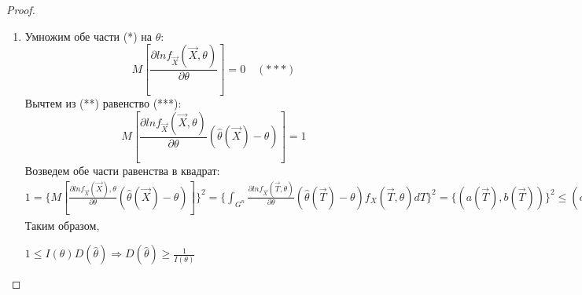 \documentclass[a4paper, 12pt]{article}
\theoremstyle{definition}
\theoremstyle{leads}
\theoremstyle{example}
\begin{document}
\begin{proof}
\begin{enumerate}
\begin{displaymath}
	\end{displaymath}
	\item Умножим обе части (*) на $\theta$:
	\begin{displaymath}
		M [\frac{\partial ln f_{\vec{X}}(\vec{X}, \theta)}{\partial \theta}] = 0 \quad (***)
	\end{displaymath}
	Вычтем из (**) равенство (***):
	\begin{displaymath}
		M [\frac{\partial ln f_{\vec{X}}(\vec{X}, \theta)}{\partial \theta}(\hat{\theta}(\vec{X}) - \theta)] = 1
	\end{displaymath}
	Возведем обе части равенства в квадрат: \\
	$
		1 = \{M [\frac{\partial ln f_{\vec{X}}(\vec{X}), \theta}{\partial \theta}(\hat{\theta}(\vec{X}) - \theta) ] \}^2 = \{ \int_{G^n}{} \frac{\partial ln f_{\vec{X}}(\vec{T}, \theta)}{\partial \theta} (\hat{\theta}(\vec{T}) - \theta) f_{X}(\vec{T}, \theta) dT\}^2 = \{(a(\vec{T}), b(\vec{T}))\}^2 \leq (a(\vec{T}), a(\vec{T})) \centerdot(b(\vec{T}), b(\vec{T})) = \int_{G^n}{} [\frac{\partial ln f_{\vec{X}}(\vec{T}, \theta)}{\partial \theta}]^2 f_{\vec{X}}(\vec{T}, \theta) d\vec{T} \centerdot\int_{G^n}{}(\hat{\theta} - \theta)^2 f_{X}(\vec{T}, \theta) d\vec{T} = M[(\frac{\partial ln f_{\vec{X}}(\vec{X}, \theta)}{\partial \theta})^2 ] \centerdot M[ (\hat{\theta}(\vec{X}) - \theta)^2] = I(\theta) \centerdot D[\hat{\theta}]$ \\
	Таким образом, 
	\begin{center}
		\centering
		$1 \leq I(\theta) D(\hat{\theta}) \Longrightarrow D(\hat{\theta}) \geq \frac{1}{I(\theta)}$
	\end{center}
	\end{enumerate}
\end{proof}
\end{document}
